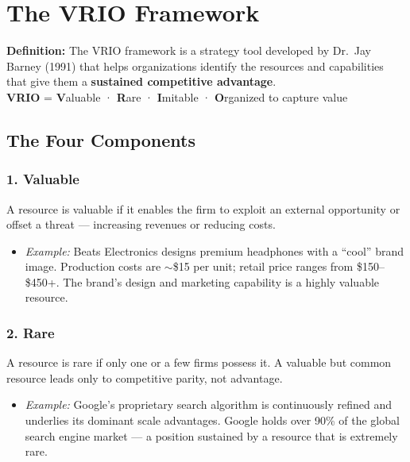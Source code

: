 \documentclass[11pt, letterpaper]{article}
\begin{document}
\newpage

\section{The VRIO Framework}

\begin{defbox}
\textbf{Definition:} The VRIO framework is a strategy tool developed by Dr.\ Jay Barney (1991) that helps organizations identify the resources and capabilities that give them a \textbf{sustained competitive advantage}.\\[0.4em]
\textbf{VRIO} = \textbf{V}aluable · \textbf{R}are · \textbf{I}mitable · \textbf{O}rganized to capture value
\end{defbox}

\subsection{The Four Components}

\subsubsection{1. Valuable}
A resource is valuable if it enables the firm to exploit an external opportunity or offset a threat --- increasing revenues or reducing costs.

\begin{itemize}[leftmargin=*]
  \item \textit{Example:} Beats Electronics designs premium headphones with a ``cool'' brand image. Production costs are $\sim$\$15 per unit; retail price ranges from \$150–\$450+. The brand's design and marketing capability is a highly valuable resource.
\end{itemize}

\subsubsection{2. Rare}
A resource is rare if only one or a few firms possess it. A valuable but common resource leads only to competitive parity, not advantage.

\begin{itemize}[leftmargin=*]
  \item \textit{Example:} Google's proprietary search algorithm is continuously refined and underlies its dominant scale advantages. Google holds over 90\% of the global search engine market --- a position sustained by a resource that is extremely rare.
\end{itemize}
\end{document}
